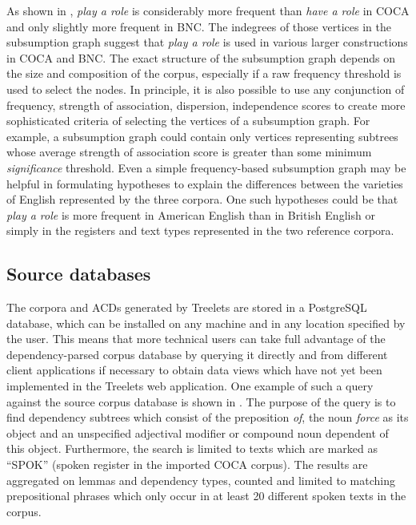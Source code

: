 \documentclass[output=paper]{langscibook}
\begin{document}
As shown in , \textit{play a role} is considerably more frequent than \textit{have a role} in COCA and only slightly more frequent in BNC. The indegrees of those vertices in the subsumption graph suggest that \textit{play a role} is used in various larger constructions in COCA and BNC. The exact structure of the subsumption graph depends on the size and composition of the corpus, especially if a raw frequency threshold is used to select the nodes. In principle, it is also possible to use any conjunction of frequency, strength of association, dispersion, independence scores to create more sophisticated criteria of selecting the vertices of a subsumption graph. For example, a subsumption graph could contain only vertices representing subtrees whose average strength of association score is greater than some minimum \textit{significance} threshold. Even a simple frequency-based subsumption graph may be helpful in formulating hypotheses to explain the differences between the varieties of English represented by the three corpora. One such hypotheses could be that \textit{play a role} is more frequent in American English than in British English or simply in the registers and text types represented in the two reference corpora.

\subsection{Source databases}

The corpora and ACDs generated by Treelets are stored in a PostgreSQL database, which can be installed on any machine and in any location specified by the user. This means that more technical users can take full advantage of the dependency-parsed corpus database by querying it directly and from different client applications if necessary to obtain data views which have not yet been implemented in the Treelets web application. One example of such a query against the source corpus database is shown in . The purpose of the query is to find dependency subtrees which consist of the preposition \textit{of}, the noun \textit{force} as its object and an unspecified adjectival modifier or compound noun dependent of this object. Furthermore, the search is limited to texts which are marked as ``SPOK'' (spoken register in the imported COCA corpus). The results are aggregated on lemmas and dependency types, counted and limited to matching prepositional phrases which only occur in at least 20 different spoken texts in the corpus.
\end{document}
